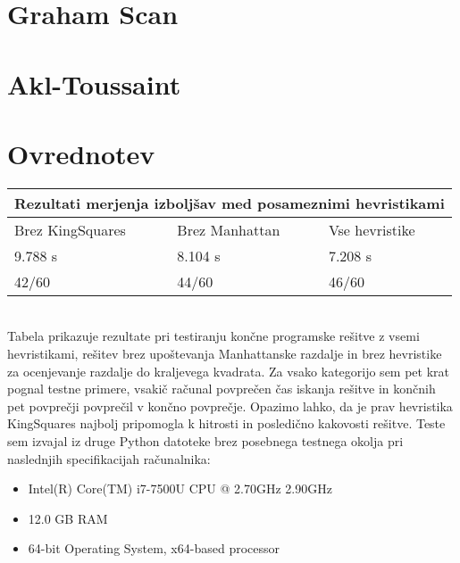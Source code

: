 \documentclass[runningheads]{llncs}
\begin{document}
\section{Graham Scan}

\section{Akl-Toussaint}

\section{Ovrednotev}


 
\setlength{\arrayrulewidth}{1mm}
\setlength{\tabcolsep}{18pt}
\renewcommand{\arraystretch}{2.5}
 
{
\begin{tabular}{ |p{3cm}|p{3cm}|p{3cm}|  }
\hline
\multicolumn{3}{|c|}{Rezultati merjenja izboljšav med posameznimi hevristikami} \\
\hline
Brez KingSquares & Brez Manhattan & Vse hevristike \\
\hline
9.788 s & 8.104 s & 7.208 s \\
42/60 & 44/60 & 46/60 \\
\hline
\end{tabular}
}
\\
Tabela prikazuje rezultate pri testiranju končne programske rešitve z vsemi hevristikami, rešitev brez upoštevanja Manhattanske razdalje in brez hevristike za ocenjevanje razdalje do kraljevega kvadrata. Za vsako kategorijo sem pet krat pognal testne primere, vsakič računal povprečen čas iskanja rešitve in končnih pet povprečji povprečil v končno povprečje. Opazimo lahko, da je prav hevristika KingSquares najbolj pripomogla k hitrosti in posledično kakovosti rešitve. Teste sem izvajal iz druge Python datoteke brez posebnega testnega okolja pri naslednjih specifikacijah računalnika:
\begin{itemize}
  \item Intel(R) Core(TM) i7-7500U CPU @ 2.70GHz 2.90GHz
  \item 12.0 GB RAM
  \item 64-bit Operating System, x64-based processor
\end{itemize}
\pagebreak
\end{document}
